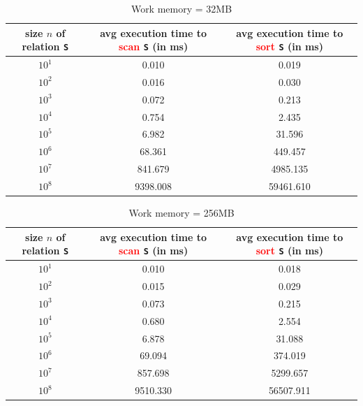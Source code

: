 \documentclass[10pt]{article}
\begin{document}
\begin{table}[H]
\begin{center}
\begin{tabular}{c|c|c}
size $n$ of relation {\tt S} & avg execution time to \textcolor{red}{scan} {\tt S} (in ms) &avg execution time to \textcolor{red}{sort} {\tt S} (in ms) \\ \hline
$10^1$&  0.010 &  0.019\\
$10^2$&  0.016 &  0.030\\
$10^3$&  0.072 &  0.213\\
$10^4$&  0.754 &  2.435\\
$10^5$&  6.982 & 31.596\\
$10^6$& 68.361 &449.457\\
$10^7$&841.679 &4985.135\\
$10^8$&9398.008&59461.610\\
\end{tabular}
\caption{Work memory = 32MB}
\end{center}
\end{table}

\begin{table}[H]
\begin{center}
\begin{tabular}{c|c|c}
size $n$ of relation {\tt S} & avg execution time to \textcolor{red}{scan} {\tt S} (in ms) &avg execution time to \textcolor{red}{sort} {\tt S} (in ms) \\ \hline
$10^1$&  0.010 &  0.018\\
$10^2$&  0.015 &  0.029\\
$10^3$&  0.073 &  0.215\\
$10^4$&  0.680 &  2.554\\
$10^5$&  6.878 & 31.088\\
$10^6$& 69.094 &374.019\\
$10^7$&857.698 &5299.657\\
$10^8$&9510.330&56507.911\\
\end{tabular}
\caption{Work memory = 256MB}
\end{center}
\end{table}
\end{document}
